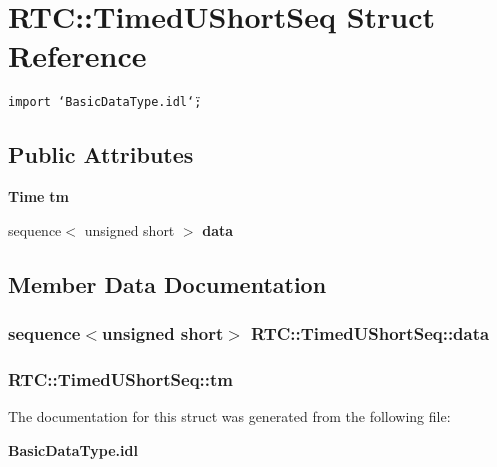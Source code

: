 \section{RTC::Timed\-UShort\-Seq Struct Reference}
\label{structRTC_1_1TimedUShortSeq}
{\tt import \char`\"{}Basic\-Data\-Type.idl\char`\"{};}

\subsection*{Public Attributes}
\begin{CompactItemize}
\item 
{\bf Time} {\bf tm}
\item 
sequence$<$ unsigned short $>$ {\bf data}
\end{CompactItemize}


\subsection{Member Data Documentation}
\subsubsection{\setlength{\rightskip}{0pt plus 5cm}sequence$<$unsigned short$>$ {\bf RTC::Timed\-UShort\-Seq::data}}\label{structRTC_1_1TimedUShortSeq_RTC_1_1TimedUShortSeqo1}


\subsubsection{ {\bf RTC::Timed\-UShort\-Seq::tm}}\label{structRTC_1_1TimedUShortSeq_RTC_1_1TimedUShortSeqo0}




The documentation for this struct was generated from the following file:\begin{CompactItemize}
\item 
{\bf Basic\-Data\-Type.idl}\end{CompactItemize}
